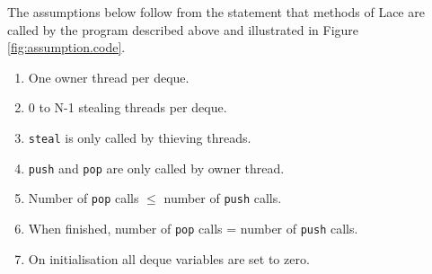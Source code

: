 \documentclass{sig-alternate-br}
\begin{document}
The assumptions below follow from the statement that methods of Lace are called by the program described above and illustrated in Figure \ref{fig:assumption.code}.
\begin{enumerate}
	\setlength{\itemsep}{-3pt}
	\item One owner thread per deque.
	\item 0 to N-1 stealing threads per deque.
	
	\item \texttt{steal} is only called by thieving threads.
	\item \texttt{push} and \texttt{pop} are only called by owner thread.

	\item Number of \texttt{pop} calls $\leq$ number of \texttt{push} calls.
	\item When finished, number of \texttt{pop} calls = number of \texttt{push} calls.
	
	\item On initialisation all deque variables are set to zero.
\end{enumerate}
\end{document}
